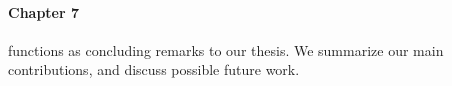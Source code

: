 
\paragraph{Chapter 7} functions as concluding remarks to our thesis. We summarize our main contributions, and discuss possible future work.